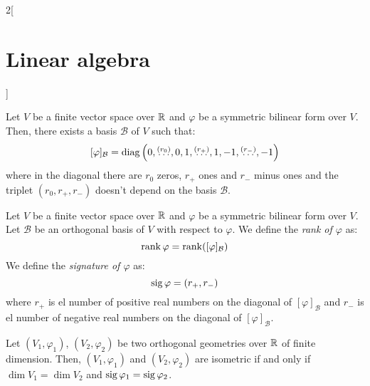 \documentclass[../../../main.tex]{subfiles}
\begin{document}
\begin{multicols}{2}[\section{Linear algebra}]
\begin{prop}
\begin{enumerate}
    \end{enumerate}
  \end{prop}
  \begin{theorem}
    Let $V$ be a finite vector space over $\mathbb{R}$ and $\varphi$ be a symmetric bilinear form over $V$. Then, there exists a basis $\mathcal{B}$ of $V$ such that:
    $$[\varphi]_\mathcal{B}=\operatorname{diag}\left(0,\overset{(r_0)}{\ldots},0,1,\overset{(r_+)}{\ldots},1,-1,\overset{(r_-)}{\ldots},-1\right)$$
    where in the diagonal there are $r_0$ zeros, $r_+$ ones and $r_-$ minus ones and the triplet $(r_0,r_+,r_-)$ doesn't depend on the basis $\mathcal{B}$.
  \end{theorem}
  \begin{definition}
    Let $V$ be a finite vector space over $\mathbb{R}$ and $\varphi$ be a symmetric bilinear form over $V$. Let $\mathcal{B}$ be an orthogonal basis of $V$ with respect to $\varphi$. We define the \textit{rank of $\varphi$} as: $$\rank \varphi=\rank ([\varphi]_\mathcal{B})$$ We define the \textit{signature of $\varphi$} as: $$\operatorname{sig}\varphi=(r_+,r_-)$$ where $r_+$ is el number of positive real numbers on the diagonal of $[\varphi]_\mathcal{B}$ and $r_-$ is el number of negative real numbers on the diagonal of $[\varphi]_\mathcal{B}$.
  \end{definition}
  \begin{theorem}
    Let $(V_1,\varphi_1)$, $(V_2,\varphi_2)$ be two orthogonal geometries over $\mathbb{R}$ of finite dimension. Then, $(V_1,\varphi_1)$ and $(V_2,\varphi_2)$ are isometric if and only if $\dim V_1=\dim V_2$ and $\operatorname{sig} \varphi_1=\operatorname{sig} \varphi_2$.
  \end{theorem}

\end{multicols}
\end{document}
